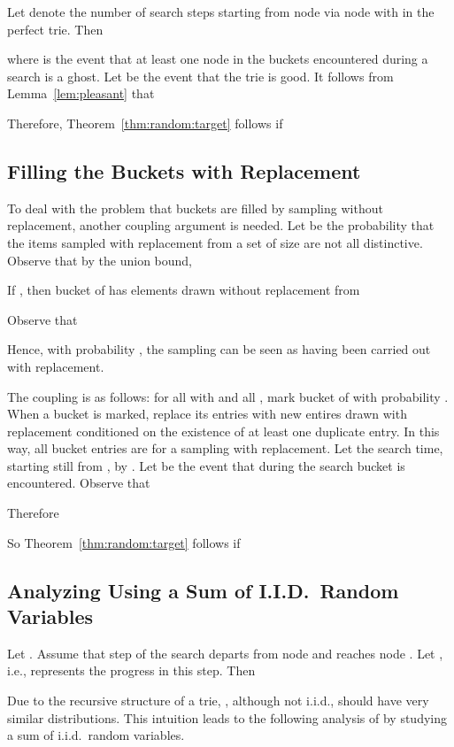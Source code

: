 \documentclass{article}
\begin{document}
Let  denote the number of search steps starting from node  via node 
with  in the perfect trie. Then

where  is the event that at least one node in the buckets
encountered during a search is a ghost. Let  be the event that the
trie is good. It follows from Lemma~\ref{lem:pleasant} that

Therefore, Theorem~\ref{thm:random:target} follows if


\subsection{Filling the Buckets with Replacement}

\label{sec:replacement}

To deal with the problem that buckets are filled by sampling without
replacement, another coupling argument is needed. Let  be the probability
that the  items sampled with replacement from a set of size  are
not all distinctive. Observe that by the union bound,

If , then bucket  of  has  elements drawn without
replacement from

Observe that

Hence, with probability , the sampling can be seen as having been
carried out with replacement. 

The coupling is as follows: for all  with  and all , mark bucket  of  with probability . When a bucket is
marked, replace its entries with  new entires drawn with replacement
conditioned on the existence of at least one duplicate entry. In this way,
all bucket entries are for a sampling with replacement. Let the search time,
starting still from , by . Let  be the event that during the
search  bucket is encountered. Observe that

Therefore

So Theorem~\ref{thm:random:target} follows if


\subsection{Analyzing  Using a Sum of I.I.D.\ Random Variables}

\label{sec:geo1}

Let . Assume that step  of the search departs from node
 and reaches node . Let ,
i.e.,  represents the progress in this step. Then

Due to the recursive structure of a  trie,
, although not i.i.d.,
should have very similar distributions. This intuition leads to the following
analysis of  by studying a sum of i.i.d.\ random variables.
\end{document}
